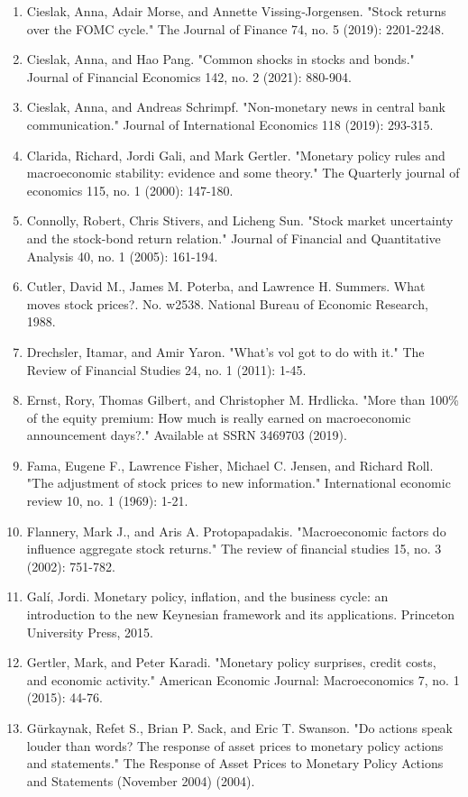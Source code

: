 \documentclass[12pt]{article}
\begin{document}
\begin{enumerate}
    \item{Cieslak, Anna, Adair Morse, and Annette Vissing‐Jorgensen. "Stock returns over the FOMC cycle." The Journal of Finance 74, no. 5 (2019): 2201-2248.}
    \item{Cieslak, Anna, and Hao Pang. "Common shocks in stocks and bonds." Journal of Financial Economics 142, no. 2 (2021): 880-904.}
    \item{Cieslak, Anna, and Andreas Schrimpf. "Non-monetary news in central bank communication." Journal of International Economics 118 (2019): 293-315.}
    \item{Clarida, Richard, Jordi Gali, and Mark Gertler. "Monetary policy rules and macroeconomic stability: evidence and some theory." The Quarterly journal of economics 115, no. 1 (2000): 147-180.}
    \item{Connolly, Robert, Chris Stivers, and Licheng Sun. "Stock market uncertainty and the stock-bond return relation." Journal of Financial and Quantitative Analysis 40, no. 1 (2005): 161-194.}
    \item{Cutler, David M., James M. Poterba, and Lawrence H. Summers. What moves stock prices?. No. w2538. National Bureau of Economic Research, 1988.}
    \item{Drechsler, Itamar, and Amir Yaron. "What's vol got to do with it." The Review of Financial Studies 24, no. 1 (2011): 1-45.}
    \item{Ernst, Rory, Thomas Gilbert, and Christopher M. Hrdlicka. "More than 100\% of the equity premium: How much is really earned on macroeconomic announcement days?." Available at SSRN 3469703 (2019).}
    \item{Fama, Eugene F., Lawrence Fisher, Michael C. Jensen, and Richard Roll. "The adjustment of stock prices to new information." International economic review 10, no. 1 (1969): 1-21.}
    \item{Flannery, Mark J., and Aris A. Protopapadakis. "Macroeconomic factors do influence aggregate stock returns." The review of financial studies 15, no. 3 (2002): 751-782.}
    \item{Galí, Jordi. Monetary policy, inflation, and the business cycle: an introduction to the new Keynesian framework and its applications. Princeton University Press, 2015.}
    \item{Gertler, Mark, and Peter Karadi. "Monetary policy surprises, credit costs, and economic activity." American Economic Journal: Macroeconomics 7, no. 1 (2015): 44-76.}
    \item{Gürkaynak, Refet S., Brian P. Sack, and Eric T. Swanson. "Do actions speak louder than words? The response of asset prices to monetary policy actions and statements." The Response of Asset Prices to Monetary Policy Actions and Statements (November 2004) (2004).}

\end{enumerate}
\end{document}
